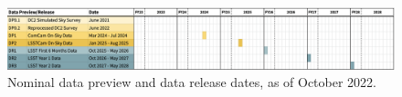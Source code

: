 \begin{figure}
\includegraphics[width=\linewidth]{figures/DPR-timeline}
\caption{Nominal data preview and data release dates, as of October 2022.}
\label{fig:timeline}
\end{figure}

%
%
%
%
%
%
%
%
